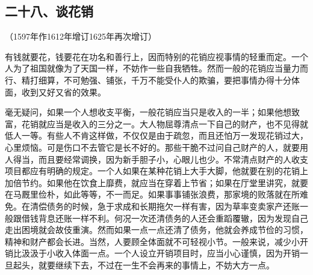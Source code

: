 \subsection*{二十八、谈花销}
\begin{center}
    （1597年作1612年增订1625年再次增订）
\end{center}
\par 有钱就要花，钱要花在功名和善行上，因而特别的花销应视事情的轻重而定。一个人为了祖国就像为了天国一样，不妨作一些自我牺牲。然而一般的花销应当量力而行、精打细算，不可勉强、铺张，千万不能受仆人的欺骗，要把事情办得十分体面，收到又好又省的效果。
\par 毫无疑问，如果一个人想收支平衡，一般花销应当只是收入的一半；如果他想致富，花销就应当是收入的三分之一。大人物屈尊清点一下自己的财产，也不见得就低人一等。有些人不肯这样做，不仅仅是由于疏忽，而且还怕万一发现花销过大，心里烦恼。可是伤口不去管它是长不好的。那些干脆不过问自己财产的人，就要用人得当，而且要经常调换，因为新手胆子小，心眼儿也少。不常清点财产的人收支项目都应有明确的规定。一个人如果在某种花销上大手大脚，他就要在别的花销上加倍节约。如果他在饮食上靡费，就应当在穿着上节省；如果在厅堂里讲究，就要在马厩里俭朴，如此等等，不一而足。如果事事铺张浪费，那家境的败落就在所难免。在清偿债务的时候，急于求成和长期拖欠一样有害，因为草率变卖家产还账一般跟借钱背息还账一样不利。何况一次还清债务的人还会重蹈覆辙，因为发现自己走出困境就会故伎重演。然而如果一点一点还清了债务，他就会养成节俭的习惯，精神和财产都会长进。当然，人要顾全体面就不可轻视小节。一般来说，减少小开销比汲汲于小收入体面一点。一个人设立开销项目时，应当小心谨慎，因为开销一旦起头，就要继续下去，不过在一生不会再来的事情上，不妨大方一点。




